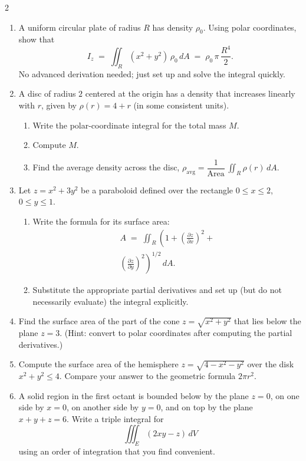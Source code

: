 \begin{multicols}{2}
\begin{enumerate}
\item A uniform circular plate of radius $R$ has density $\rho_0$. Using polar coordinates, show that  
\[
I_z \;=\;\iint_R (x^2 + y^2)\,\rho_0\,dA 
\;=\; \rho_0\,\pi\,\frac{R^4}{2}.
\]
No advanced derivation needed; just set up and solve the integral quickly.

\item A disc of radius $2$ centered at the origin has a density that increases linearly with $r$, given by $\rho(r)=4+r$ (in some consistent units).  
\begin{enumerate}
   \item Write the polar-coordinate integral for the total mass $M$.  
   \item Compute $M$.  
   \item Find the average density across the disc, $\rho_{\text{avg}}=\dfrac{1}{\text{Area}}\,\iint_R \rho(r)\,dA$.
\end{enumerate}

\item Let $z = x^2 + 3y^2$ be a paraboloid defined over the rectangle $0\le x\le 2$, $0\le y\le 1$.  
\begin{enumerate}
   \item Write the formula for its surface area:  
\begin{multline*}
   A \;=\; \iint_R \left(1 + \left(\frac{\partial z}{\partial x}\right)^2 + \right. \\ 
   \left. \left(\frac{\partial z}{\partial y}\right)^2 \right)^{1/2}\,dA.
\end{multline*}




   \item Substitute the appropriate partial derivatives and set up (but do not necessarily evaluate) the integral explicitly.
\end{enumerate}

\item Find the surface area of the part of the cone \( z = \sqrt{x^2 + y^2} \) that lies below the plane \( z = 3 \). (Hint: convert to polar coordinates after computing the partial derivatives.)

\item Compute the surface area of the hemisphere \( z = \sqrt{4 - x^2 - y^2} \) over the disk \( x^2 + y^2 \leq 4 \). Compare your answer to the geometric formula \( 2\pi r^2 \).

\item 
A solid region in the first octant is bounded below by the plane \(z=0\), on one side by \(x=0\), on another side by \(y=0\), and on top by the plane \(x + y + z = 6\). Write a triple integral for
\[
\iiint_E (2xy - z)\,dV
\]
using an order of integration that you find convenient.


\end{enumerate}
\end{multicols}
